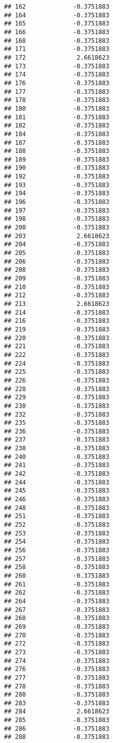 \documentclass[
]{article}
\begin{document}
\begin{verbatim}
## 162             -0.3751883
## 164             -0.3751883
## 165             -0.3751883
## 166             -0.3751883
## 168             -0.3751883
## 171             -0.3751883
## 172              2.6618623
## 173             -0.3751883
## 174             -0.3751883
## 176             -0.3751883
## 177             -0.3751883
## 178             -0.3751883
## 180             -0.3751883
## 181             -0.3751883
## 182             -0.3751883
## 184             -0.3751883
## 187             -0.3751883
## 188             -0.3751883
## 189             -0.3751883
## 190             -0.3751883
## 192             -0.3751883
## 193             -0.3751883
## 194             -0.3751883
## 196             -0.3751883
## 197             -0.3751883
## 198             -0.3751883
## 200             -0.3751883
## 203              2.6618623
## 204             -0.3751883
## 205             -0.3751883
## 206             -0.3751883
## 208             -0.3751883
## 209             -0.3751883
## 210             -0.3751883
## 212             -0.3751883
## 213              2.6618623
## 214             -0.3751883
## 216             -0.3751883
## 219             -0.3751883
## 220             -0.3751883
## 221             -0.3751883
## 222             -0.3751883
## 224             -0.3751883
## 225             -0.3751883
## 226             -0.3751883
## 228             -0.3751883
## 229             -0.3751883
## 230             -0.3751883
## 232             -0.3751883
## 235             -0.3751883
## 236             -0.3751883
## 237             -0.3751883
## 238             -0.3751883
## 240             -0.3751883
## 241             -0.3751883
## 242             -0.3751883
## 244             -0.3751883
## 245             -0.3751883
## 246             -0.3751883
## 248             -0.3751883
## 251             -0.3751883
## 252             -0.3751883
## 253             -0.3751883
## 254             -0.3751883
## 256             -0.3751883
## 257             -0.3751883
## 258             -0.3751883
## 260             -0.3751883
## 261             -0.3751883
## 262             -0.3751883
## 264             -0.3751883
## 267             -0.3751883
## 268             -0.3751883
## 269             -0.3751883
## 270             -0.3751883
## 272             -0.3751883
## 273             -0.3751883
## 274             -0.3751883
## 276             -0.3751883
## 277             -0.3751883
## 278             -0.3751883
## 280             -0.3751883
## 283             -0.3751883
## 284              2.6618623
## 285             -0.3751883
## 286             -0.3751883
## 288             -0.3751883

\end{verbatim}
\end{document}
